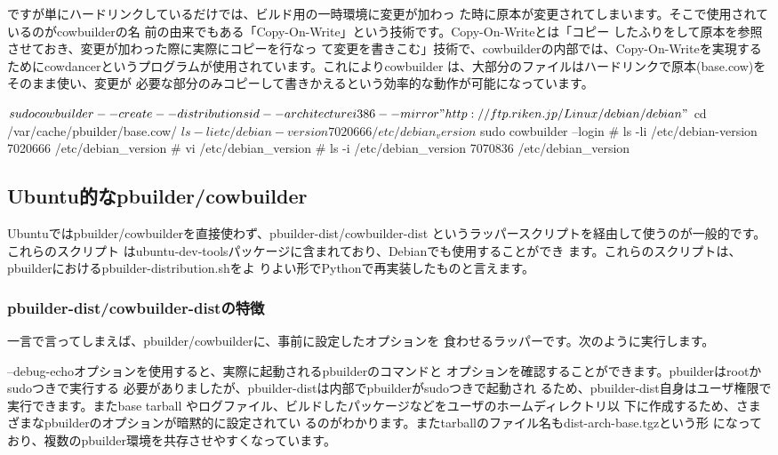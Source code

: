 \documentclass[mingoth,a4paper]{jsarticle}
\begin{document}
ですが単にハードリンクしているだけでは、ビルド用の一時環境に変更が加わっ
た時に原本が変更されてしまいます。そこで使用されているのがcowbuilderの名
前の由来でもある「Copy-On-Write」という技術です。Copy-On-Writeとは「コピー
したふりをして原本を参照させておき、変更が加わった際に実際にコピーを行なっ
て変更を書きこむ」技術で、cowbuilderの内部では、Copy-On-Writeを実現する
ためにcowdancerというプログラムが使用されています。これによりcowbuilder
は、大部分のファイルはハードリンクで原本(base.cow)をそのまま使い、変更が
必要な部分のみコピーして書きかえるという効率的な動作が可能になっています。

\begin{commandline}
$ sudo cowbuilder --create --distribution sid --architecture i386 --mirror "http://ftp.riken.jp/Linux/debian/debian"
$ cd /var/cache/pbuilder/base.cow/
$ ls -li etc/debian-version
7020666 /etc/debian_version
$ sudo cowbuilder --login
# ls -li /etc/debian-version
7020666 /etc/debian_version
# vi /etc/debian_version
# ls -i /etc/debian_version
7070836 /etc/debian_version
\end{commandline}

\subsection{Ubuntu的なpbuilder/cowbuilder}

Ubuntuではpbuilder/cowbuilderを直接使わず、pbuilder-dist/cowbuilder-dist
というラッパースクリプトを経由して使うのが一般的です。これらのスクリプト
はubuntu-dev-toolsパッケージに含まれており、Debianでも使用することができ
ます。これらのスクリプトは、pbuilderにおけるpbuilder-distribution.shをよ
りよい形でPythonで再実装したものと言えます。

\subsubsection{pbuilder-dist/cowbuilder-distの特徴}

一言で言ってしまえば、pbuilder/cowbuilderに、事前に設定したオプションを
食わせるラッパーです。次のように実行します。


--debug-echoオプションを使用すると、実際に起動されるpbuilderのコマンドと
  オプションを確認することができます。pbuilderはrootかsudoつきで実行する
  必要がありましたが、pbuilder-distは内部でpbuilderがsudoつきで起動され
  るため、pbuilder-dist自身はユーザ権限で実行できます。またbase tarball
  やログファイル、ビルドしたパッケージなどをユーザのホームディレクトリ以
  下に作成するため、さまざまなpbuilderのオプションが暗黙的に設定されてい
  るのがわかります。またtarballのファイル名もdist-arch-base.tgzという形
  になっており、複数のpbuilder環境を共存させやすくなっています。
\end{document}
